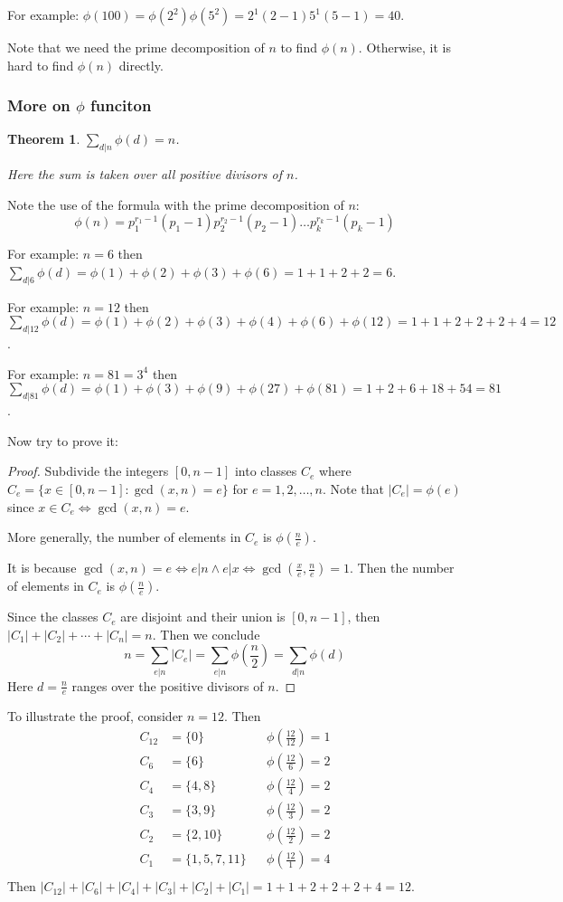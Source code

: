 \documentclass[letterpaper,12pt,oneside]{article}
\newtheorem{theorem}{Theorem}
\begin{document}
For example: $\phi(100)=\phi(2^2)\phi(5^2)=2^1(2-1)5^1(5-1)=40$.

Note that we need the prime decomposition of $n$ to find $\phi(n)$. Otherwise, it is hard to find $\phi(n)$ directly.
\subsubsection{More on $\phi$ funciton}
\begin{theorem}
    $\sum_{d|n}\phi(d)=n$. 
    
    Here the sum is taken over all positive divisors of $n$.
\end{theorem}
Note the use of the formula with the prime decomposition of $n$: \[\phi(n)=p_1^{r_1-1}(p_1-1)p_2^{r_2-1}(p_2-1)\ldots p_k^{r_k-1}(p_k-1)\]

For example: $n=6$ then $\sum_{d|6}\phi(d)=\phi(1)+\phi(2)+\phi(3)+\phi(6)=1+1+2+2=6$.

For example: $n=12$ then $\sum_{d|12}\phi(d)=\phi(1)+\phi(2)+\phi(3)+\phi(4)+\phi(6)+\phi(12)=1+1+2+2+2+4=12$.

For example: $n=81=3^4$ then $\sum_{d|81}\phi(d)=\phi(1)+\phi(3)+\phi(9)+\phi(27)+\phi(81)=1+2+6+18+54=81$.

Now try to prove it:\begin{proof}
    Subdivide the integers $[0,n-1]$ into classes $C_e$ where $C_e=\{x\in [0,n-1]:\gcd(x,n)=e\}$ for $e=1,2,\ldots,n$. Note that $|C_e|=\phi(e)$ since $x\in C_e \iff \gcd(x,n)=e$.

    More generally, the number of elements in $C_e$ is $\phi(\frac{n}{e})$. 
    
    It is because $\gcd(x,n)=e \iff e|n \land e | x \iff \gcd(\frac{x}{e},\frac{n}{e})=1$. Then the number of elements in $C_e$ is $\phi(\frac{n}{e})$.

    Since the classes $C_e$ are disjoint and their union is $[0,n-1]$, then $|C_1|+|C_2|+\cdots+|C_n|=n$. Then we conclude \[
        n=\sum_{e|n}|C_e|=\sum_{e|n}\phi(\frac{n}{2})=\sum_{d|n}\phi(d)
    \]
    Here $d=\frac{n}{e}$ ranges over the positive divisors of $n$.
\end{proof}

To illustrate the proof, consider $n=12$. Then \begin{align*}
    C_{12} & = \{0\} && \phi(\frac{12}{12})=1 \\
    C_6 & = \{6\} && \phi(\frac{12}{6})=2 \\
    C_4 & = \{4,8\} && \phi(\frac{12}{4})=2 \\
    C_3 & = \{3,9\} && \phi(\frac{12}{3})=2 \\
    C_2 & = \{2,10\} && \phi(\frac{12}{2})=2 \\
    C_1 & = \{1,5,7,11\} && \phi(\frac{12}{1})=4 \\
\end{align*}
Then $|C_{12}|+|C_6|+|C_4|+|C_3|+|C_2|+|C_1|=1+1+2+2+2+4=12$.
\end{document}
